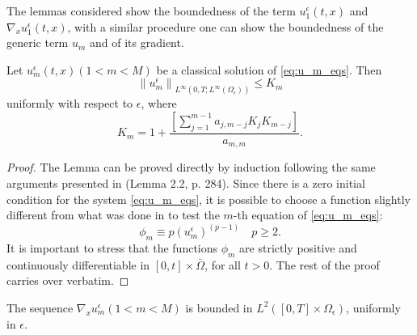 The lemmas considered show the boundedness of the term $u_1^{\epsilon}(t,x)$ and $\nabla_{x} u_{1}^{\epsilon}(t, x)$, with a similar procedure one can show the boundedness of the generic term $u_m$ and of its gradient.
\begin{lemma} Let $u_{m}^{\epsilon}(t, x)(1<m<M)$ be a classical solution of \eqref{eq:u_m_eqs}. Then
\begin{equation}
  \left\|u_{m}^{\epsilon}\right\|_{L^{\infty}\left(0, T ; L^{\infty}\left(\Omega_{\epsilon}\right)\right)} \leq K_{m}
\label{eq 62}\end{equation}
uniformly with respect to $\epsilon$, where
\begin{equation}
  K_{m}=1+\frac{\left[\sum_{j=1}^{m-1} a_{j, m-j} K_{j} K_{m-j}\right]}{a_{m, m}}.
\label{eq 63}\end{equation}
\label{lemma 5.5}\end{lemma}
\begin{proof}
The Lemma can be proved directly by induction following the same arguments presented in \cite{Wrzosek_1997} (Lemma 2.2, p. 284). Since there is a zero initial condition for the system \eqref{eq:u_m_eqs}, it is possible to choose a function slightly different from what was done in \cite{Wrzosek_1997} to test the $m$-th equation of \eqref{eq:u_m_eqs}:
$$
\phi_{m} \equiv p\left(u_{m}^{\epsilon}\right)^{(p-1)} \quad p \geq 2 .
$$
It is important to stress that the functions $\phi_{m}$ are strictly positive and continuously differentiable in $[0, t] \times \bar{\Omega}$, for all $t>0$. The rest of the proof carries over verbatim.
\end{proof} 
\begin{lemma}
The sequence $\nabla_{x} u_{m}^{\epsilon}(1<m<M)$ is bounded in $L^{2}\left([0, T] \times \Omega_{\epsilon}\right)$, uniformly in $\epsilon$.
\label{lemma 5.6}\end{lemma}
